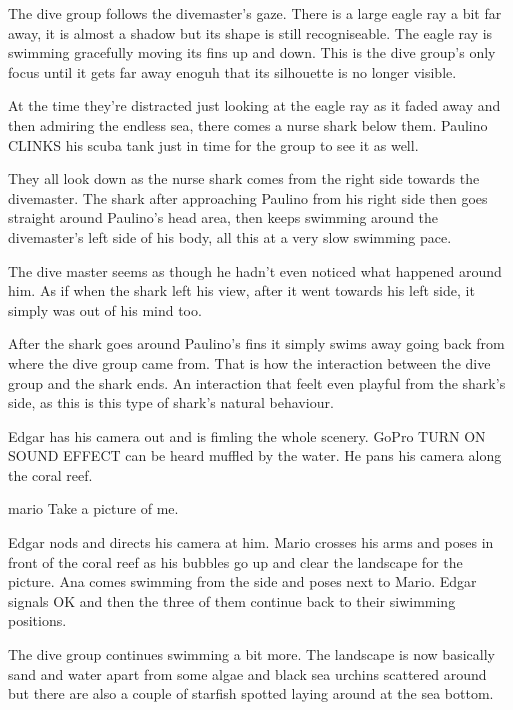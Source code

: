 \documentclass{screenplay}
\begin{document}
The dive group follows the divemaster's gaze. There is a large eagle ray a bit far away, it is almost a shadow but its shape is still recogniseable. The eagle ray is swimming gracefully moving its fins up and down. This is the dive group's only focus until it gets far away enoguh that its silhouette is no longer visible.

At the time they're distracted just looking at the eagle ray as it faded away and then admiring the endless sea, there comes a nurse shark below them. Paulino CLINKS his scuba tank just in time for the group to see it as well.

They all look down as the nurse shark comes from the right side towards the divemaster. The shark after approaching Paulino from his right side then goes straight around Paulino's head area, then keeps swimming around the divemaster's left side of his body, all this at a very slow swimming pace.

The dive master seems as though he hadn't even noticed what happened around him. As if when the shark left his view, after it went towards his left side, it simply was out of his mind too.

After the shark goes around Paulino's fins it simply swims away going back from where the dive group came from. That is how the interaction between the dive group and the shark ends. An interaction that feelt even playful from the shark's side, as this is this type of shark's natural behaviour.

Edgar has his camera out and is fimling the whole scenery. GoPro TURN ON SOUND EFFECT can be heard muffled by the water. He pans his camera along the coral reef.

\begin{dialogue}{mario}
Take a picture of me.
\end{dialogue}

Edgar nods and directs his camera at him. Mario crosses his arms and poses in front of the coral reef as his bubbles go up and clear the landscape for the picture. Ana comes swimming from the side and poses next to Mario. Edgar signals OK and then the three of them continue back to their siwimming positions.

\pagebreak

The dive group continues swimming a bit more. The landscape is now basically sand and water apart from some algae and black sea urchins scattered around but there are also a couple of starfish spotted laying around at the sea bottom.
\end{document}
